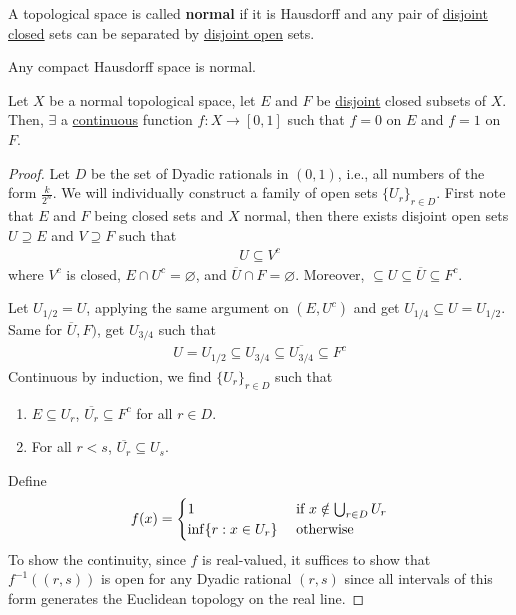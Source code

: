 \documentclass[11pt]{article}
\begin{document}
	\begin{definition}
		A topological space is called \textbf{normal} if it is Hausdorff and any pair of \ul{disjoint closed} sets can be separated by \ul{disjoint open} sets.
	\end{definition}
	
	\begin{lemma}
		Any compact Hausdorff space is normal.
	\end{lemma}
	
	\begin{theorem}
		Let $X$ be a normal topological space, let $E$ and $F$ be \ul{disjoint} closed subsets of $X$.
		Then, $\exists$ a \ul{continuous} function $f: X \to [0, 1]$ such that $f = 0$ on $E$ and $f=1$ on $F$.
		\begin{proof}
			Let $D$ be the set of Dyadic rationals in $(0, 1)$, i.e., all numbers of the form $\frac{k}{2^n}$.
			We will individually construct a family of open sets $\{U_r\}_{r \in D}$.
			First note that $E$ and $F$ being closed sets and $X$ normal, then there exists disjoint open sets $U \supseteq E$ and $V \supseteq F$ such that
			\begin{align}
				U \subseteq V^c
			\end{align}
			where $V^c$ is closed, $E \cap U^c = \varnothing$, and $\overline{U} \cap F = \varnothing$. Moreover, $ \subseteq U \subseteq \overline{U} \subseteq F^c$. 
			
			Let $U_{1/2} = U$, applying the same argument on $(E, U^c)$ and get $U_{1/4} \subseteq U = U_{1/2}$.
			Same for $\overline{U}, F)$, get $U_{3/4}$ such that 
			\begin{align}
				U = U_{1/2} \subseteq U_{3/4} \subseteq \overline{U_{3/4}} \subseteq F^c
			\end{align}
			Continuous by induction, we find $\{U_r\}_{r \in D}$ such that
			\begin{enumerate}
				\item $E \subseteq U_r$, $\overline{U_r} \subseteq F^c$ for all $r \in D$.
				\item For all $r < s$, $\overline{U_r} \subseteq U_s$.
			\end{enumerate}
			Define
			\begin{align}
				f(x) = \begin{cases}
					1 &\text{{ if }} x \notin \bigcup_{r \in D} U_r \\
					\inf\{r : x \in U_r\} &\text{{ otherwise}}
				\end{cases}
			\end{align}
			To show the continuity, since $f$ is real-valued, it suffices to show that $f^{-1}((r, s))$ is open for any Dyadic rational $(r, s)$ since all intervals of this form generates the Euclidean topology on the real line.
			

\end{proof}
\end{theorem}
\end{document}
